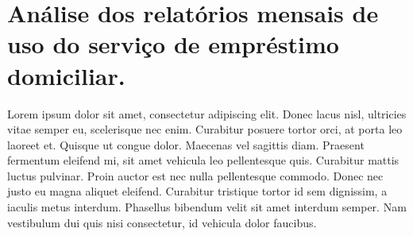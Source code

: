 {\let\clearpage\relax \chapter{\textnormal{Análise dos
	  relatórios mensais de uso do serviço de empréstimo domiciliar.}}}

Lorem ipsum dolor sit amet, consectetur adipiscing elit. Donec lacus nisl,
ultricies vitae semper eu, scelerisque nec enim. Curabitur posuere tortor orci,
at porta leo laoreet et. Quisque ut congue dolor. Maecenas vel sagittis diam.
Praesent fermentum eleifend mi, sit amet vehicula leo pellentesque quis.
Curabitur mattis luctus pulvinar. Proin auctor est nec nulla pellentesque
commodo. Donec nec justo eu magna aliquet eleifend. Curabitur tristique tortor
id sem dignissim, a iaculis metus interdum. Phasellus bibendum velit sit amet
interdum semper. Nam vestibulum dui quis nisi consectetur, id vehicula dolor
faucibus.\\